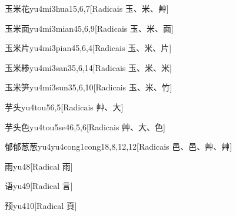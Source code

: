 \begin{entry}{玉米花}{yu4mi3hua1}{5,6,7}[Radicais ⽟、⽶、⾋]
\end{entry}

\begin{entry}{玉米面}{yu4mi3mian4}{5,6,9}[Radicais ⽟、⽶、⾯]
\end{entry}

\begin{entry}{玉米片}{yu4mi3pian4}{5,6,4}[Radicais ⽟、⽶、⽚]
\end{entry}

\begin{entry}{玉米糁}{yu4mi3san3}{5,6,14}[Radicais ⽟、⽶、⽶]
\end{entry}

\begin{entry}{玉米笋}{yu4mi3sun3}{5,6,10}[Radicais ⽟、⽶、⽵]
\end{entry}

\begin{entry}{芋头}{yu4tou5}{6,5}[Radicais ⾋、⼤]
\end{entry}

\begin{entry}{芋头色}{yu4tou5se4}{6,5,6}[Radicais ⾋、⼤、⾊]
\end{entry}

\begin{entry}{郁郁葱葱}{yu4yu4cong1cong1}{8,8,12,12}[Radicais ⾢、⾢、⾋、⾋]
\end{entry}

\begin{entry}{雨}{yu4}{8}[Radical ⾬]
\end{entry}

\begin{entry}{语}{yu4}{9}[Radical ⾔]
\end{entry}

\begin{entry}{预}{yu4}{10}[Radical ⾴]
\end{entry}

